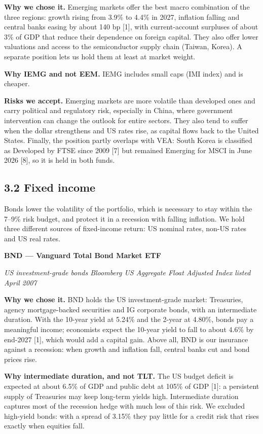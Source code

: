 \documentclass[
]{article}
\begin{document}
\textbf{Why we chose it.} Emerging markets offer the best macro
combination of the three regions: growth rising from 3.9\% to 4.4\% in
2027, inflation falling and central banks easing by about 140 bp
{[}1{]}, with current-account surpluses of about 3\% of GDP that reduce
their dependence on foreign capital. They also offer lower valuations
and access to the semiconductor supply chain (Taiwan, Korea). A separate
position lets us hold them at least at market weight.

\textbf{Why IEMG and not EEM.} IEMG includes small caps (IMI index) and
is cheaper.

\textbf{Risks we accept.} Emerging markets are more volatile than
developed ones and carry political and regulatory risk, especially in
China, where government intervention can change the outlook for entire
sectors. They also tend to suffer when the dollar strengthens and US
rates rise, as capital flows back to the United States. Finally, the
position partly overlaps with VEA: South Korea is classified as
Developed by FTSE since 2009 {[}7{]} but remained Emerging for MSCI in
June 2026 {[}8{]}, so it is held in both funds.

\hypertarget{fixed-income}{%
\subsection{3.2 Fixed income}\label{fixed-income}}

Bonds lower the volatility of the portfolio, which is necessary to stay
within the 7--9\% risk budget, and protect it in a recession with
falling inflation. We hold three different sources of fixed-income
return: US nominal rates, non-US rates and US real rates.

\textbf{BND --- Vanguard Total Bond Market ETF}

\emph{US investment-grade bonds \textperiodcentered{} Bloomberg US Aggregate Float Adjusted
Index \textperiodcentered{} listed April 2007}

\textbf{Why we chose it.} BND holds the US investment-grade market:
Treasuries, agency mortgage-backed securities and IG corporate bonds,
with an intermediate duration. With the 10-year yield at 5.24\% and the
2-year at 4.80\%, bonds pay a meaningful income; economists expect the
10-year yield to fall to about 4.6\% by end-2027 {[}1{]}, which would
add a capital gain. Above all, BND is our insurance against a recession:
when growth and inflation fall, central banks cut and bond prices rise.

\textbf{Why intermediate duration, and not TLT.} The US budget deficit
is expected at about 6.5\% of GDP and public debt at 105\% of GDP
{[}1{]}: a persistent supply of Treasuries may keep long-term yields
high. Intermediate duration captures most of the recession hedge with
much less of this risk. We excluded high-yield bonds: with a spread of
3.15\% they pay little for a credit risk that rises exactly when
equities fall.
\end{document}
